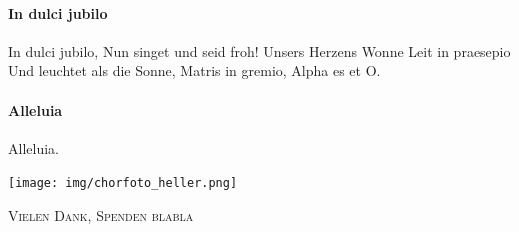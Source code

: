 \documentclass[11pt, ngermanm, titlepage]{article}
\begin{document}
\begin{multicols}{2}
	\paragraph{In dulci jubilo\newline}
	In dulci jubilo,\newline
	Nun singet und seid froh!\newline
	Unsers Herzens Wonne\newline 
	Leit in praesepio\newline
	Und leuchtet als die Sonne,\newline
	Matris in gremio,\newline
	Alpha es et O.
	
	\paragraph{Alleluia\newline}
	Alleluia.
		
	\end{multicols}

	\pagebreak
	\quad
	\pagebreak
	
	\centering
	\texttt{[image: img/chorfoto\_heller.png]}\par\vspace{2cm}
	
	{\scshape\Large Vielen Dank, Spenden blabla\par}
	\vspace{1.5cm}
	
\end{document}
